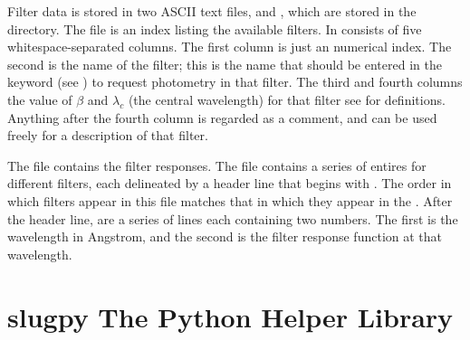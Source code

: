 \documentclass[letterpaper,10pt,english]{sphinxmanual}
\begin{document}
Filter data is stored in two ASCII text files,  and , which are stored in the  directory. The  file is an index listing the available filters. In consists of five whitespace-separated columns. The first column is just an numerical index. The second is the name of the filter; this is the name that should be entered in the  keyword (see {\hyperref[\detokenize{parameters:ssec-phot-keywords}]{}}) to request photometry in that filter. The third and fourth columns the value of \(\beta\) and \(\lambda_c\) (the central wavelength) for that filter \textendash{} see {\hyperref[\detokenize{intro:ssec-spec-phot}]{}} for definitions. Anything after the fourth column is regarded as a comment, and can be used freely for a description of that filter.

The  file contains the filter responses. The file contains a series of entires for different filters, each delineated by a header line that begins with \sphinxcode{\#}. The order in which filters appear in this file matches that in which they appear in the . After the header line, are a series of lines each containing two numbers. The first is the wavelength in Angstrom, and the second is the filter response function at that wavelength.


\chapter{slugpy \textendash{} The Python Helper Library}
\label{\detokenize{slugpy:slugpy-the-python-helper-library}}\label{\detokenize{slugpy:sec-slugpy}}\label{\detokenize{slugpy::doc}}
\end{document}
